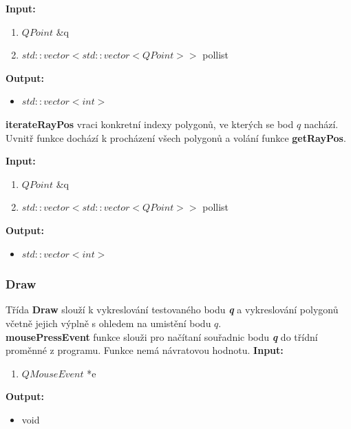 \documentclass{article}
\begin{document}
\bigskip 

 \textbf{Input:}
\begin{enumerate} 
\item $QPoint$ \&q
\item $std::vector<std::vector<QPoint>> $ pollist
\end{enumerate}

\bigskip 
\textbf{Output:}
\begin{itemize} 
\item $std::vector<int>$
\end{itemize}

\bigskip 

\textbf{iterateRayPos} vraci konkretní indexy polygonů, ve kterých se bod $q$ nachází. Uvnitř funkce dochází k procházení všech polygonů a volání funkce \textbf{getRayPos}.
 \\ 

\bigskip 

 \textbf{Input:}
\begin{enumerate} 
\item $QPoint$ \&q
\item $std::vector<std::vector<QPoint>> $ pollist
\end{enumerate}

\bigskip 
\textbf{Output: }
\begin{itemize} 
\item $std::vector<int>$
\end{itemize}

\subsubsection{Draw} 


\bigskip 

Třída \textbf{Draw} slouží k vykreslování testovaného bodu \textit{\textbf {q}} a vykreslování polygonů včetně jejich 
výplně s ohledem na umistění bodu  $q$.\\


\bigskip 
\textbf{mousePressEvent} funkce slouži pro načítaní souřadnic bodu \textit{\textbf {q}} do třídní proměnné z programu. Funkce nemá návratovou hodnotu.
\bigskip 
 \textbf{Input:}
\begin{enumerate} 
\item $QMouseEvent$ *e
\end{enumerate}
\bigskip 
 \textbf{Output:}
\begin{itemize} 
\item void
\end{itemize}
\bigskip
\end{document}
